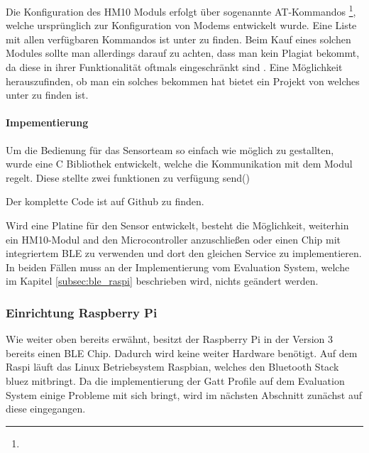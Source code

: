 Die Konfiguration des HM10 Moduls erfolgt über sogenannte AT-Kommandos \footnote{\todo{} }, welche ursprünglich zur Konfiguration von Modems entwickelt wurde. Eine Liste mit allen verfügbaren Kommandos ist unter \todo{ } zu finden. Beim Kauf eines solchen Modules sollte man allerdings darauf zu achten, dass man kein Plagiat bekommt, da diese in ihrer Funktionalität oftmals eingeschränkt sind . Eine Möglichkeit herauszufinden, ob man ein solches bekommen hat bietet ein Projekt von  welches unter  zu finden ist.

\paragraph{Impementierung}
Um die Bedienung für das Sensorteam so einfach wie möglich zu gestallten, wurde eine C Bibliothek entwickelt, welche die Kommunikation mit dem Modul regelt. Diese stellte zwei funktionen zu verfügung  send() %

Der komplette Code ist auf Github zu finden.

Wird eine Platine für den Sensor entwickelt, besteht die Möglichkeit, weiterhin ein HM10-Modul and den Microcontroller anzuschließen oder einen Chip mit integriertem BLE zu verwenden und dort den gleichen Service zu implementieren. In beiden Fällen muss an der Implementierung vom Evaluation System, welche im Kapitel \ref{subsec:ble_raspi} beschrieben wird, nichts geändert werden.

\subsubsection{Einrichtung Raspberry Pi}
Wie weiter oben bereits erwähnt, besitzt der Raspberry Pi in der Version 3 bereits einen BLE Chip. Dadurch wird keine weiter Hardware benötigt. Auf dem Raspi läuft das Linux Betriebsystem Raspbian, welches den Bluetooth Stack bluez mitbringt. Da die implementierung der Gatt Profile auf dem Evaluation System einige Probleme mit sich bringt, wird im nächsten Abschnitt zunächst auf diese eingegangen.


